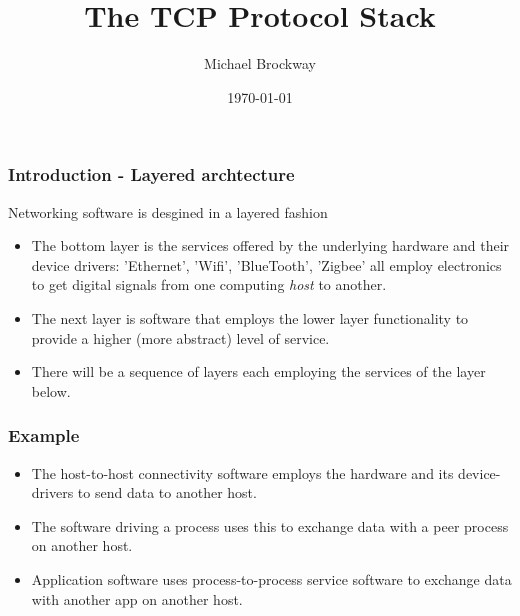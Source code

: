 \documentclass[10pt, hyperref={pdfpagelabels=false}]{beamer}
\title{The TCP Protocol Stack}
\author{Michael Brockway}
\date{\today}
\begin{document}
\begin{frame}
\titlepage
\end{frame}

\begin{frame}
\frametitle{Introduction - Layered archtecture}
Networking software is desgined in a layered fashion
\begin{itemize}
\item The bottom layer is the services offered by the underlying hardware and their device drivers: 'Ethernet', 'Wifi', 'BlueTooth', 'Zigbee' all employ electronics to get digital signals from one computing \emph{host} to another.
\item The next layer is software that employs the lower layer functionality to  provide a higher (more abstract) level of service.
\item There will be a sequence of layers each employing the services of the layer below.
\end{itemize}
\end{frame}

\begin{frame}
\frametitle{Example}
\begin{center}
\begin{itemize}
\item The host-to-host connectivity software employs the hardware and its device-drivers to send data to another host.
\item The software driving a process uses this to exchange data with a peer process on another host.
\item Application software uses process-to-process service software to exchange data with another app on another host.
\end{itemize} 
\end{center}
\end{frame}
\end{document}
